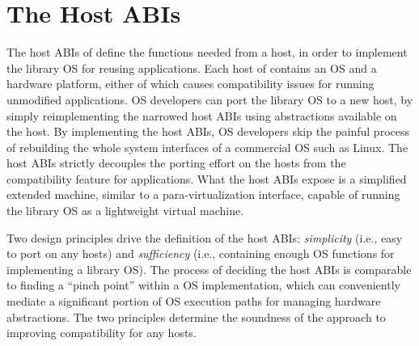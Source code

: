 \section{The Host ABIs}
\label{sec:overview:host}

The host ABIs of \graphene{}
define the functions needed from a host, in order to implement the library OS for reusing applications.
Each host of \graphene{} contains an OS and a hardware platform, either of which causes compatibility issues for running unmodified applications.
OS developers can port the library OS to a new host,
by simply reimplementing the narrowed host ABIs using abstractions available on the host.
By implementing the host ABIs, OS developers skip the painful process of rebuilding the whole system interfaces of a commercial OS such as Linux.
The host ABIs strictly decouples the porting effort on the hosts from the compatibility feature for applications.
What the host ABIs expose is a simplified extended machine,
similar to a para-virtualization interface, capable of running the library OS as a lightweight virtual machine. %

Two design principles drive the definition of the host ABIs:
{\em simplicity} (i.e., easy to port on any hosts)
and {\em sufficiency} (i.e., containing enough OS functions for implementing a library OS).
The process of deciding the host ABIs is comparable to
finding a ``pinch point'' within a OS implementation,
which can conveniently mediate a significant portion of OS execution paths for managing hardware abstractions.
The two principles
determine the soundness of the \graphene{} approach to improving compatibility
for any hosts.



